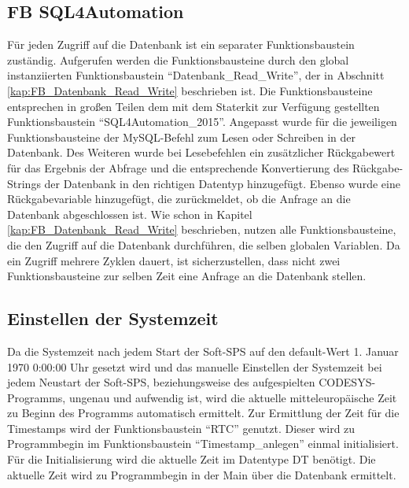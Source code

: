 \subsection{FB SQL4Automation}\label{kap:FB_SQL4Automation}
Für jeden Zugriff auf die Datenbank ist ein separater Funktionsbaustein zuständig. Aufgerufen werden die Funktionsbausteine durch den global instanziierten Funktionsbaustein "`Daten\-ba\-nk\_Read\_Write"', der in Abschnitt \ref{kap:FB_Datenbank_Read_Write} beschrieben ist. Die Funktionsbausteine entsprechen in großen Teilen dem mit dem Staterkit zur Verfügung gestellten Funktionsbaustein "`SQL4Auto\-mat\-ion\_2015"'. Angepasst wurde für die jeweiligen Funktionsbausteine der MySQL-Befehl zum Lesen oder Schreiben in der Datenbank. Des Weiteren wurde bei Lesebefehlen ein zusätzlicher Rückgabewert für das Ergebnis der Abfrage und die entsprechende Konvertierung des Rückgabe-Strings der Datenbank in den richtigen Datentyp hinzugefügt. Ebenso wurde eine Rückgabevariable hinzugefügt, die zurückmeldet, ob die Anfrage an die Datenbank abgeschlossen ist. Wie schon in Kapitel \ref{kap:FB_Datenbank_Read_Write} beschrieben, nutzen alle Funktionsbausteine, die den Zugriff auf die Datenbank durchführen, die selben globalen Variablen. Da ein Zugriff mehrere Zyklen dauert, ist sicherzustellen, dass nicht zwei Funktionsbausteine zur selben Zeit eine Anfrage an die Datenbank stellen. 



\subsection{Einstellen der Systemzeit}
\label{kap:Systemzeit_Einstellen}
Da die Systemzeit nach jedem Start der Soft-SPS auf den default-Wert 1. Januar 1970 0:00:00 Uhr gesetzt wird und das manuelle Einstellen der Systemzeit bei jedem Neustart der Soft-SPS, beziehungsweise des aufgespielten CODESYS-Programms, ungenau und aufwendig ist, wird die aktuelle mitteleuropäische Zeit zu Beginn des Programms automatisch ermittelt. Zur Ermittlung der Zeit für die Timestamps wird der Funktionsbaustein "`RTC"' genutzt. Dieser wird zu Programmbegin im Funktionsbaustein "`Timestamp\_anlegen"' einmal initialisiert. Für die Initialisierung wird die aktuelle Zeit im Datentype DT benötigt. Die aktuelle Zeit wird zu Programmbegin in der Main über die Datenbank ermittelt. 

